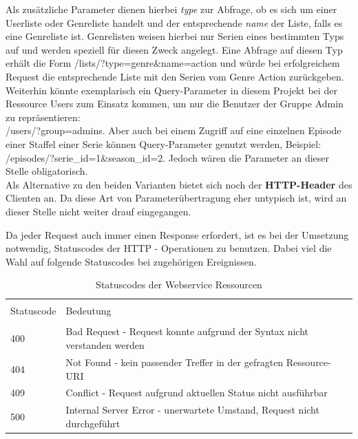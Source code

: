 Als zusätzliche Parameter dienen hierbei \textit{type} zur Abfrage, ob es sich um einer Userliste oder Genreliste handelt und der entsprechende \textit{name} der Liste, falls es eine Genreliste ist.
Genrelisten weisen hierbei nur Serien eines bestimmten Typs auf und werden speziell für diesen Zweck angelegt. Eine Abfrage auf diesen Typ erhält die Form \textsf{/lists/?type=genre\&name=action} und würde bei erfolgreichem Request die entsprechende Liste mit den Serien vom Genre Action zurückgeben.
\\
Weiterhin könnte exemplarisch  ein Query-Parameter in diesem Projekt bei der Ressource Users zum Einsatz kommen, um nur die Benutzer der Gruppe Admin zu repräsentieren:\\ \textsf{/users/?group=admins}. Aber auch bei einem Zugriff auf eine einzelnen Episode einer Staffel einer Serie können Query-Parameter genutzt werden, Beispiel: \textsf{/episodes/?serie\_id=1\&season\_id=2}. Jedoch wären die Parameter an dieser Stelle obligatorisch.
\\
Als Alternative zu den beiden Varianten bietet sich noch der \textbf{HTTP-Header} des Clienten an. Da diese Art von Parameterübertragung eher untypisch ist, wird an dieser Stelle nicht weiter drauf eingegangen.

\parskip 12pt
\parindent 0pt
Da jeder Request auch immer einen Response erfordert, ist es bei der Umsetzung notwendig, Statuscodes der HTTP - Operationen zu benutzen. Dabei viel die Wahl auf folgende Statuscodes bei zugehörigen Ereignissen.

\begin{table}[H]
\caption{Statuscodes der Webservice Ressourcen}

\centering
\begin{tabular}{l l l}
\\ [-0.5ex]

\hline\hline
\\ [-0.5ex]
Statuscode & Bedeutung
\\ [1.5ex]
\hline
\\ [-0.5ex]
400 & Bad Request - Request konnte aufgrund der Syntax nicht verstanden werden\\[1ex]
404 & Not Found - kein passender Treffer in der gefragten Ressource-URI \\[1ex]
409 & Conflict - Request aufgrund aktuellen Status nicht ausführbar\\[1ex]
500 & Internal Server Error - unerwartete Umstand, Request nicht durchgeführt\\[1ex]

\hline
\end{tabular}
\label{tab:statuscodes}
\end{table}

